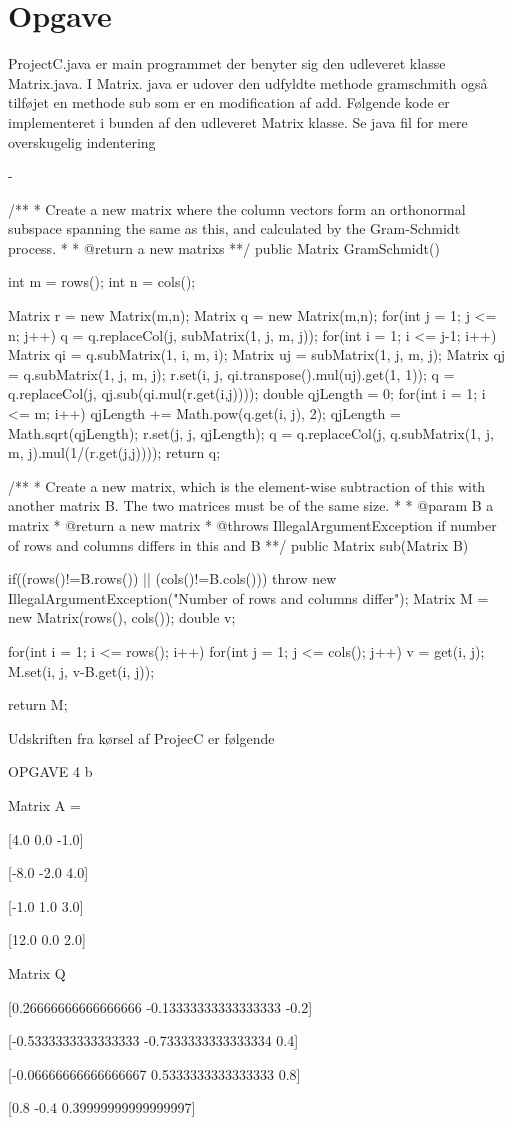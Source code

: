 \documentclass[12pt]{article}
\begin{document}
\section{Opgave}
\begin{enumerate}[(a)]
ProjectC.java er main programmet der benyter sig den udleveret klasse
Matrix.java. I Matrix. java er udover den udfyldte methode gramschmith
også tilføjet en methode sub som er en modification af add. 
Følgende kode er implementeret i bunden af den udleveret Matrix klasse.
Se java fil for mere overskugelig indentering

-  

  /**
   * Create a new matrix where the column vectors form an orthonormal subspace spanning the same as this, and calculated by the Gram-Schmidt process.
   *
   * @return a new matrixs
   **/
  public Matrix GramSchmidt() {
    int m = rows();
    int n = cols();

    Matrix r = new Matrix(m,n);
	Matrix q = new Matrix(m,n);
    for(int j = 1; j <= n; j++){
        q = q.replaceCol(j, subMatrix(1, j, m, j));
        for(int i = 1; i <= j-1; i++){
            Matrix qi = q.subMatrix(1, i, m, i);
            Matrix uj = subMatrix(1, j, m, j);
            Matrix qj = q.subMatrix(1, j, m, j);
            r.set(i, j, qi.transpose().mul(uj).get(1, 1));
            q = q.replaceCol(j, qj.sub(qi.mul(r.get(i,j))));
        }
        double qjLength = 0;
        for(int i = 1; i <= m; i++){
            qjLength += Math.pow(q.get(i, j), 2);
        }
        qjLength = Math.sqrt(qjLength);
        r.set(j, j, qjLength);
        q = q.replaceCol(j, q.subMatrix(1, j, m, j).mul(1/(r.get(j,j))));
    }
	return q;
  }

  /**
   * Create a new matrix, which is the element-wise subtraction of this with another matrix B.  The two matrices must be of the same size.
   *
   * @param B a matrix
   * @return a new matrix
   * @throws IllegalArgumentException if number of rows and columns differs in this and B
   **/
  public Matrix sub(Matrix B) {
	if((rows()!=B.rows()) || (cols()!=B.cols())) {
      throw new IllegalArgumentException("Number of rows and columns differ");
	}
	Matrix M = new Matrix(rows(), cols());
	double v;

	for(int i = 1; i <= rows(); i++) {
      for(int j = 1; j <= cols(); j++) {
		v = get(i, j);
		M.set(i, j, v-B.get(i, j));
      }
	}

	return M;
  }

Udskriften fra kørsel af ProjecC er følgende

OPGAVE 4 b 

Matrix A = 

[4.0 0.0 -1.0]

[-8.0 -2.0 4.0]

[-1.0 1.0 3.0]

[12.0 0.0 2.0]

Matrix Q

[0.26666666666666666 -0.13333333333333333 -0.2]

[-0.5333333333333333 -0.7333333333333334 0.4]

[-0.06666666666666667 0.5333333333333333 0.8]

[0.8 -0.4 0.39999999999999997]

\end{enumerate}
\end{document}
